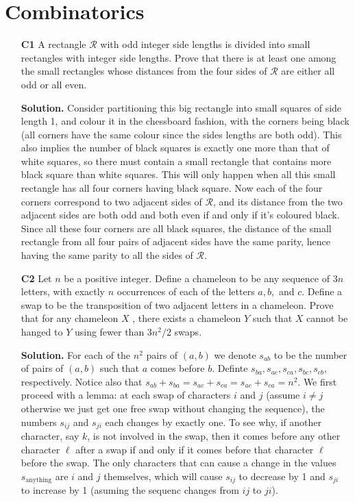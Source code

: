 \documentclass[11pt,a4paper]{article}
\begin{document}
\begin{enumerate}
\end{enumerate}

\section{Combinatorics}
\begin{enumerate}
	\item[\textbf{C1}] A rectangle $\mathcal{R}$ with odd integer side lengths is divided into small rectangles with integer side lengths. Prove that there is at least one among the small rectangles whose distances from the four sides of $\mathcal{R}$ are either all odd or all even. 
	
	\textbf{Solution.} Consider partitioning this big rectangle into small squares of side length 1, and colour it in the chessboard fashion, with the corners being black (all corners have the same colour since the sides lengths are both odd). This also implies the number of black squares is exactly one more than that of white squares, so there must contain a small rectangle that contains more black square than white squares. This will only happen when all this small rectangle has all four corners having black square. Now each of the four corners correspond to two adjacent sides of $\mathcal{R}$, and its distance from the two adjacent sides are both odd and both even if and only if it's coloured black. Since all these four corners are all black squares, the distance of the small rectangle from all four pairs of adjacent sides have the same parity, hence having the same parity to all the sides of $\mathcal{R}$. 
	
	\item[\textbf{C2}] Let $n$ be a positive integer. Define a chameleon to be any sequence of $3n$ letters, with exactly $n$ occurrences of each of the letters $a, b,$ and $c$. Define a swap to be the transposition of two adjacent letters in a chameleon. Prove that for any chameleon $X$ , there exists a chameleon $Y$ such that $X$ cannot be hanged to $Y$ using fewer than $3n^2/2$ swaps.
	
	\textbf{Solution.} For each of the $n^2$ pairs of $(a, b)$ we denote $s_{ab}$ to be the number of pairs of $(a, b)$ such that $a$ comes before $b$. Definte $s_{ba}, s_{ac}, s_{ca}, s_{bc}, s_{cb}$, respectively. Notice also that $s_{ab}+s_{ba}=s_{ac} + s_{ca}= s_{ac} + s_{ca} = n^2$. We first proceed with a lemma: at each swap of characters $i$ and $j$ (assume $i\neq j$ otherwise we just get one free swap without changing the sequence), the numbers $s_{ij}$ and $s_{ji}$ each changes by exactly one. To see why, if another character, say $k$, is not involved in the swap, then it comes before any other character $\ell$ after a swap if and only if it comes before that character $\ell$ before the swap. The only characters that can cause a change in the values $s_{\text{anything}}$ are $i$ and $j$ themselves, which will cause $s_{ij}$ to decrease by 1 and $s_{ji}$ to increase by 1 (asuming the sequenc changes from $ij$ to $ji$). 
	

\end{enumerate}
\end{document}
